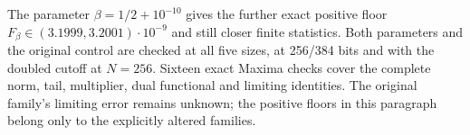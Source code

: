 The parameter $\beta=1/2+10^{-10}$ gives the further exact positive floor
$F_\beta\in(3.1999,3.2001)\cdot10^{-9}$ and still closer finite statistics.
Both parameters and the original control are checked at all five sizes,
at 256/384 bits and with the doubled cutoff at $N=256$. Sixteen exact
Maxima checks cover the complete norm, tail, multiplier, dual functional
and limiting identities. The original family's limiting error remains
unknown; the positive floors in this paragraph belong only to the
explicitly altered families.
